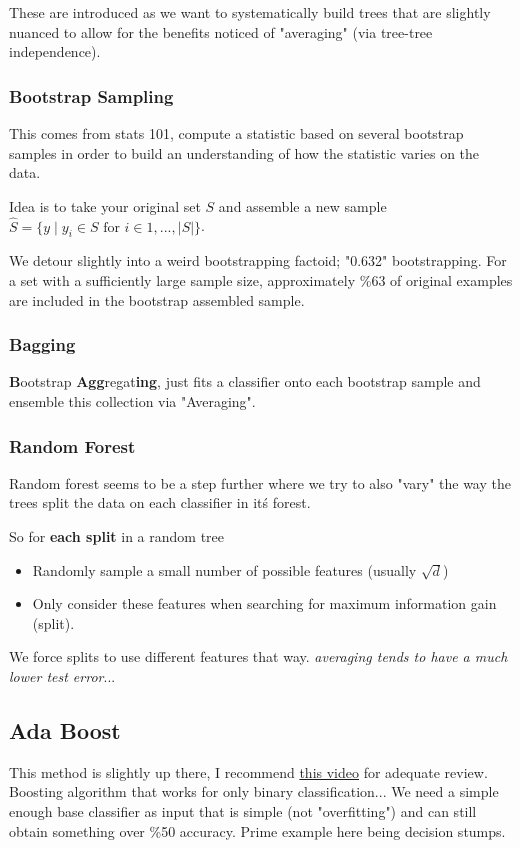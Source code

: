 \documentclass{article}
\begin{document}
These are introduced as we want to systematically build trees that are slightly nuanced to allow for the benefits noticed of "averaging" (via tree-tree independence).

\subsubsection*{Bootstrap Sampling}
This comes from stats 101, compute a statistic based on several bootstrap samples in order to build an understanding of how the statistic varies on the data.

Idea is to take your original set $S$ and assemble a new sample $\hat S = \{ y \mid y_i \in S \text{ for } i \in 1,...,|S| \}$.

We detour slightly into a weird bootstrapping factoid; "0.632" bootstrapping. For a set with a sufficiently large sample size, approximately \%63 of original examples are included in the bootstrap assembled sample.

\subsubsection*{Bagging}
{\bf B}ootstrap {\bf Agg}regat{\bf ing}, just fits a classifier onto each bootstrap sample and ensemble this collection via "Averaging".

\subsubsection*{Random Forest}
Random forest seems to be a step further where we try to also "vary" the way the trees split the data on each classifier in it\'s forest.

So for {\bf each split} in a random tree
\begin{itemize}
	\item Randomly sample a small number of possible features (usually $\sqrt d$)
	\item Only consider these features when searching for maximum information gain (split).
\end{itemize}

We force splits to use different features that way. {\em averaging tends to have a much lower test error}...

\subsection*{Ada Boost}
This method is slightly up there, I recommend \href{https://www.youtube.com/watch?v=LsK-xG1cLYA}{this video} for adequate review. Boosting algorithm that works for only binary classification... We need a simple enough base classifier as input that is simple (not "overfitting") and can still obtain something over \%50 accuracy. Prime example here being decision stumps.
\end{document}
